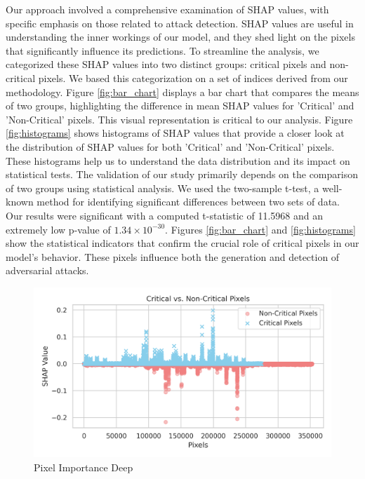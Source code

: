 \documentclass[10pt, conference, a4paper, final]{IEEEtran}
\begin{document}
    Our approach involved a comprehensive examination of SHAP values, with specific emphasis on those related to attack detection. SHAP values are useful in understanding the inner workings of our model, and they shed light on the pixels that significantly influence its predictions. To streamline the analysis, we categorized these SHAP values into two distinct groups: critical pixels and non-critical pixels. We based this categorization on a set of indices derived from our methodology.
    Figure \ref{fig:bar_chart} displays a bar chart that compares the means of two groups, highlighting the difference in mean SHAP values for 'Critical' and 'Non-Critical' pixels. This visual representation is critical to our analysis.   
    Figure \ref{fig:histograms} shows histograms of SHAP values that provide a closer look at the distribution of SHAP values for both 'Critical' and 'Non-Critical' pixels. These histograms help us to understand the data distribution and its impact on statistical tests.    
    The validation of our study primarily depends on the comparison of two groups using statistical analysis. We used the two-sample t-test, a well-known method for identifying significant differences between two sets of data. Our results were significant with a computed t-statistic of 11.5968 and an extremely low p-value of $1.34 \times 10^{-30}$. Figures \ref{fig:bar_chart} and \ref{fig:histograms} show the statistical indicators that confirm the crucial role of critical pixels in our model's behavior. These pixels influence both the generation and detection of adversarial attacks.
    
 
        \begin{figure}
            \centering
            \includegraphics[width=0.9\linewidth]{deepexplainer/ttest.png}
            \caption{Pixel Importance Deep}
        \end{figure}
     
\end{document}
